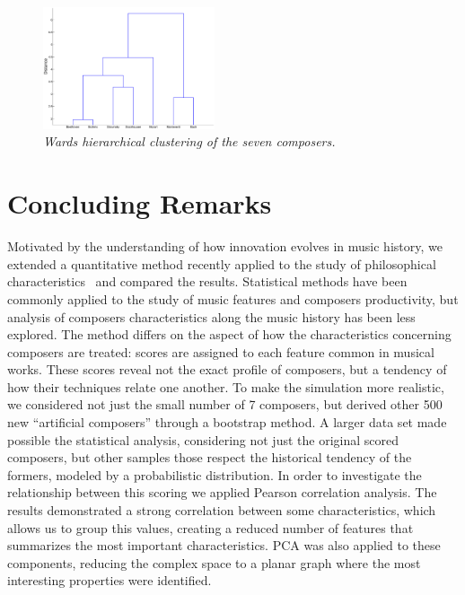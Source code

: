\documentclass[
 aip,
 jmp,
 amsmath,amssymb,
 reprint,
]{revtex4-1}
\begin{document}
\begin{figure}[ht]
        \begin{center}
          \includegraphics[width=0.45\textwidth]{Clust_Compositores.eps}
        \end{center}
        \caption{\it Wards hierarchical clustering of the seven composers.}
        \label{fig:dendrogram}
\end{figure}


\section{Concluding Remarks}

Motivated by the understanding of how innovation evolves in music
history, we extended a quantitative method
recently applied to the study of philosophical
characteristics~\cite{Fabbri} and compared the results. Statistical
methods have been commonly applied to the study of music features and
composers productivity, but analysis of
composers characteristics along the music history has been less
explored. The method differs on the
aspect of how the characteristics concerning composers are treated:
scores are assigned to each feature common in musical
works. These scores reveal not the
exact profile of composers, but a tendency of how their
techniques relate one another. To make the simulation more
realistic, we considered not just the small number of 7 composers, but
derived other 500 new ``artificial composers'' through a bootstrap
method. A larger data set made possible the statistical analysis,
considering not just the original scored composers, but other samples
those respect the historical tendency of the formers, modeled by a
probabilistic distribution.
In order to investigate the
relationship between this scoring we applied Pearson correlation
analysis. The results demonstrated a strong correlation between some
characteristics, which allows us to group this values, creating a
reduced number of features that summarizes the most important
characteristics. PCA was also applied to these components, reducing
the complex space to a planar graph where the most interesting
properties were identified. 
\end{document}
